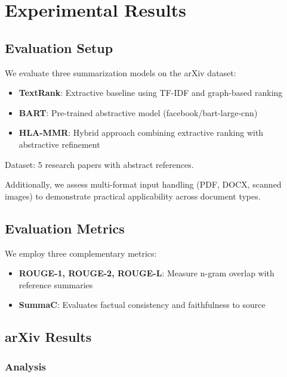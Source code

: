 
\section{Experimental Results}

\subsection{Evaluation Setup}

We evaluate three summarization models on the arXiv dataset:

\begin{itemize}
    \item \textbf{TextRank}: Extractive baseline using TF-IDF and graph-based ranking
    \item \textbf{BART}: Pre-trained abstractive model (facebook/bart-large-cnn)
    \item \textbf{HLA-MMR}: Hybrid approach combining extractive ranking with abstractive refinement
\end{itemize}

Dataset: 5 research papers with abstract references.

Additionally, we assess multi-format input handling (PDF, DOCX, scanned images) to demonstrate 
practical applicability across document types.

\subsection{Evaluation Metrics}

We employ three complementary metrics:

\begin{itemize}
    \item \textbf{ROUGE-1, ROUGE-2, ROUGE-L}: Measure n-gram overlap with reference summaries
    \item \textbf{SummaC}: Evaluates factual consistency and faithfulness to source
\end{itemize}

\subsection{arXiv Results}



\subsubsection{Analysis}

